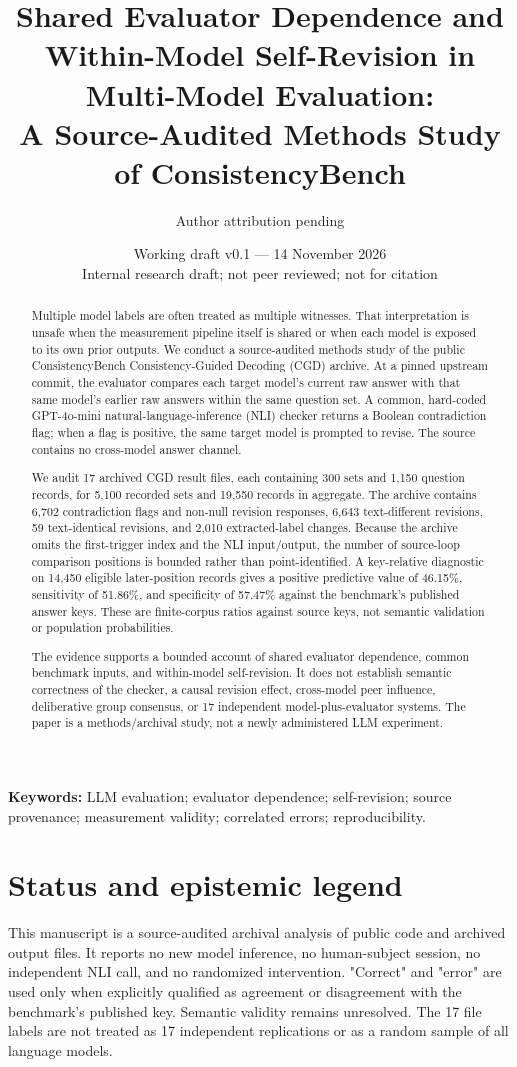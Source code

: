 \documentclass[11pt]{article}
\title{Shared Evaluator Dependence and Within-Model Self-Revision in Multi-Model Evaluation:\\A Source-Audited Methods Study of ConsistencyBench}
\author{Author attribution pending}
\date{Working draft v0.1 --- 14 November 2026\\[0.4em]\large Internal research draft; not peer reviewed; not for citation}
\begin{document}
\maketitle

\begin{abstract}
Multiple model labels are often treated as multiple witnesses. That interpretation is unsafe when the measurement pipeline itself is shared or when each model is exposed to its own prior outputs. We conduct a source-audited methods study of the public ConsistencyBench Consistency-Guided Decoding (CGD) archive. At a pinned upstream commit, the evaluator compares each target model's current raw answer with that same model's earlier raw answers within the same question set. A common, hard-coded GPT-4o-mini natural-language-inference (NLI) checker returns a Boolean contradiction flag; when a flag is positive, the same target model is prompted to revise. The source contains no cross-model answer channel.

We audit 17 archived CGD result files, each containing 300 sets and 1,150 question records, for 5,100 recorded sets and 19,550 records in aggregate. The archive contains 6,702 contradiction flags and non-null revision responses, 6,643 text-different revisions, 59 text-identical revisions, and 2,010 extracted-label changes. Because the archive omits the first-trigger index and the NLI input/output, the number of source-loop comparison positions is bounded rather than point-identified. A key-relative diagnostic on 14,450 eligible later-position records gives a positive predictive value of 46.15\%, sensitivity of 51.86\%, and specificity of 57.47\% against the benchmark's published answer keys. These are finite-corpus ratios against source keys, not semantic validation or population probabilities.

The evidence supports a bounded account of shared evaluator dependence, common benchmark inputs, and within-model self-revision. It does not establish semantic correctness of the checker, a causal revision effect, cross-model peer influence, deliberative group consensus, or 17 independent model-plus-evaluator systems. The paper is a methods/archival study, not a newly administered LLM experiment.
\end{abstract}

\textbf{Keywords:} LLM evaluation; evaluator dependence; self-revision; source provenance; measurement validity; correlated errors; reproducibility.

\section*{Status and epistemic legend}
This manuscript is a source-audited archival analysis of public code and archived output files. It reports no new model inference, no human-subject session, no independent NLI call, and no randomized intervention. "Correct" and "error" are used only when explicitly qualified as agreement or disagreement with the benchmark's published key. Semantic validity remains unresolved. The 17 file labels are not treated as 17 independent replications or as a random sample of all language models.
\end{document}
